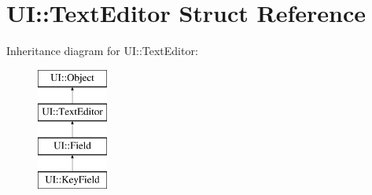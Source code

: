 \hypertarget{struct_u_i_1_1_text_editor}{}\section{UI\+:\+:Text\+Editor Struct Reference}
\label{struct_u_i_1_1_text_editor}
Inheritance diagram for UI\+:\+:Text\+Editor\+:\begin{figure}[H]
\begin{center}
\leavevmode
\includegraphics[height=4.000000cm]{struct_u_i_1_1_text_editor}
\end{center}
\end{figure}

